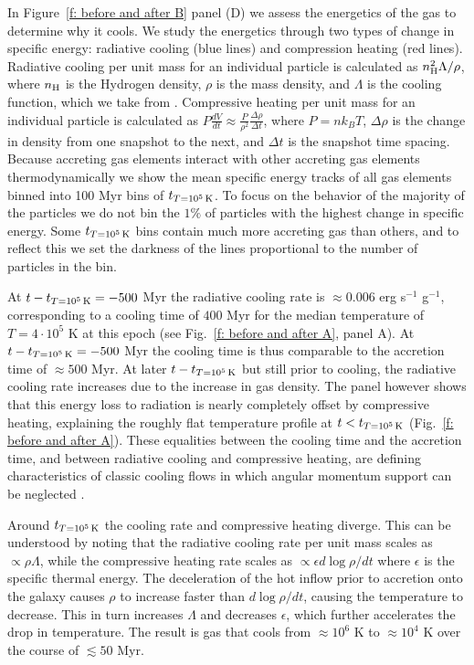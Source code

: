 \documentclass[fleqn,usenatbib]{mnras}
\newcommand{\tcon}{t_{T=10^5\,{\rm K}}}
\newcommand{\nH}{n_{\rm H}}
\begin{document}
In Figure~\ref{f: before and after B} panel (D) we assess the energetics of the gas to determine why it cools.
We study the energetics through two types of change in specific energy: radiative cooling (blue lines) and compression heating (red lines).
Radiative cooling per unit mass for an individual particle is calculated as $\nH^2 \Lambda / \rho$, where $\nH$ is the Hydrogen density, $\rho$ is the mass density, and $\Lambda$ is the cooling function, which we take from \cite{Wiersma2009a}.
Compressive heating per unit mass for an individual particle is calculated as $P \frac{dV}{dt} \approx \frac{ P }{ \rho^2 } \frac{ \Delta \rho }{ \Delta t }$, where $P = n k_B T$, $\Delta \rho$ is the change in density from one snapshot to the next, and $\Delta t$ is the snapshot time spacing.
Because accreting gas elements interact with other accreting gas elements thermodynamically we show the mean specific energy tracks of all gas elements binned into 100 Myr bins of $\tcon$.
To focus on the behavior of the majority of the particles we do not bin the $1\%$ of particles with the highest change in specific energy.
Some $\tcon$ bins contain much more accreting gas than others, and to reflect this we set the darkness of the lines proportional to the number of particles in the bin.

At $t-\tcon=-500$ Myr the radiative cooling rate is $\approx0.006$ erg s$^{-1}$ g$^{-1}$, corresponding to a cooling time of $400$ Myr for the median temperature of $T=4\cdot10^5$ K at this epoch (see Fig.~\ref{f: before and after A}, panel A). At $t-\tcon =-500$ Myr the cooling time is thus comparable to the accretion time of $\approx500$ Myr. At later $t-\tcon$ but still prior to cooling, the radiative cooling rate increases due to the increase in gas density. The panel however shows that this energy loss to radiation  is nearly completely offset by compressive heating, explaining the roughly flat temperature profile at $t<\tcon$ (Fig.~\ref{f: before and after A}). 
These equalities between the cooling time and the accretion time, and between radiative cooling and compressive heating, are defining   characteristics of classic cooling flows in which angular momentum support can be neglected \citep{Mathews1978, McNamara2007, Stern2019}. 

Around $\tcon$ the cooling rate and compressive heating diverge. This can be understood by noting that the radiative cooling rate per unit mass scales as $\propto\rho\Lambda$, while the compressive heating rate scales as $\propto\epsilon d\log\rho/d t$ where $\epsilon$ is the specific thermal energy. The deceleration of the hot inflow prior to accretion onto the galaxy causes $\rho$ to increase faster than  $d\log\rho/d t$, causing the temperature to decrease. This in turn increases $\Lambda$ and decreases $\epsilon$, which further accelerates the drop in temperature. The result is gas that cools from $\approx10^6$ K to $\approx10^4$ K over the course of $\lesssim 50$ Myr.
\end{document}
